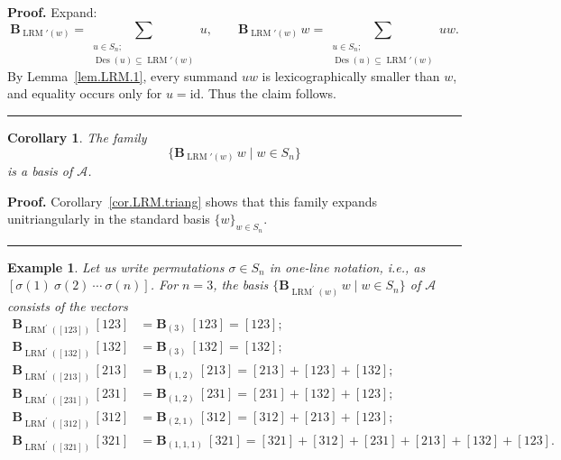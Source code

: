 \documentclass[submission]{FPSAC2026}
\newtheorem{corollary}{Corollary}
\newtheorem{example}{Example}
\newcommand{\Des}{\operatorname{Des}}
\newcommand{\ive}[1]{\left[ #1 \right]}
\newenvironment{proof}[1][Proof]{\noindent\textbf{#1.} }{\ \rule{0.5em}{0.5em}}
\begin{document}
\begin{proof}
Expand:
\[
\mathbf{B}_{\operatorname{LRM}'(w)}
 = \sum_{\substack{u\in S_n;\\\Des(u)\subseteq \operatorname{LRM}'(w)}} u,
\qquad
\mathbf{B}_{\operatorname{LRM}'(w)}\,w
 = \sum_{\substack{u\in S_n;\\\Des(u)\subseteq \operatorname{LRM}'(w)}} uw.
\]
By Lemma~\ref{lem.LRM.1}, every summand $uw$ is lexicographically smaller than $w$, and equality occurs only for $u=\mathrm{id}$.  Thus the claim follows.
\end{proof}

\begin{corollary}
\label{cor.LRM.basis}
The family
\[
\bigl\{
\mathbf{B}_{\operatorname{LRM}'(w)}\, w
\;\big|\; w\in S_n
\bigr\}
\]
is a basis of $\mathcal{A}$.
\end{corollary}

\begin{proof}
Corollary~\ref{cor.LRM.triang} shows that this family expands unitriangularly in the standard basis $\{w\}_{w\in S_n}$.
\end{proof}

\begin{example}
Let us write permutations $\sigma\in S_{n}$ in one-line notation, i.e., as
$\left[  \sigma\left(  1\right)  \ \sigma\left(  2\right)  \ \cdots
\ \sigma\left(  n\right)  \right]  $. For $n=3$, the basis $\bigl\{\mathbf{B}%
_{\operatorname{LRM}^{\prime}(w)}\,w\;\big|\;w\in S_{n}\bigr\}$ of
$\mathcal{A}$ consists of the vectors%
\begin{align*}
\mathbf{B}_{\operatorname{LRM}^{\prime}(\left[  123\right]  )}\,\left[
123\right]    & =\mathbf{B}_{\left(  3\right)  }\ \left[  123\right]  =\left[
123\right]  ;\\
\mathbf{B}_{\operatorname{LRM}^{\prime}(\left[  132\right]  )}\,\left[
132\right]    & =\mathbf{B}_{\left(  3\right)  }\ \left[  132\right]  =\left[
132\right]  ;\\
\mathbf{B}_{\operatorname{LRM}^{\prime}(\left[  213\right]  )}\,\left[
213\right]    & =\mathbf{B}_{\left(  1,2\right)  }\ \left[  213\right]
=\left[  213\right]  +\left[  123\right]  +\left[  132\right]  ;\\
\mathbf{B}_{\operatorname{LRM}^{\prime}(\left[  231\right]  )}\,\left[
231\right]    & =\mathbf{B}_{\left(  1,2\right)  }\ \left[  231\right]
=\left[  231\right]  +\left[  132\right]  +\left[  123\right]  ;\\
\mathbf{B}_{\operatorname{LRM}^{\prime}(\left[  312\right]  )}\,\left[
312\right]    & =\mathbf{B}_{\left(  2,1\right)  }\ \left[  312\right]
=\left[  312\right]  +\left[  213\right]  +\left[  123\right]  ;\\
\mathbf{B}_{\operatorname{LRM}^{\prime}(\left[  321\right]  )}\,\left[
321\right]    & =\mathbf{B}_{\left(  1,1,1\right)  }\ \left[  321\right]
= \ive{321} + \ive{312} + \ive{231} + \ive{213} + \ive{132} + \ive{123}.
\end{align*}
\end{example}
\end{document}
